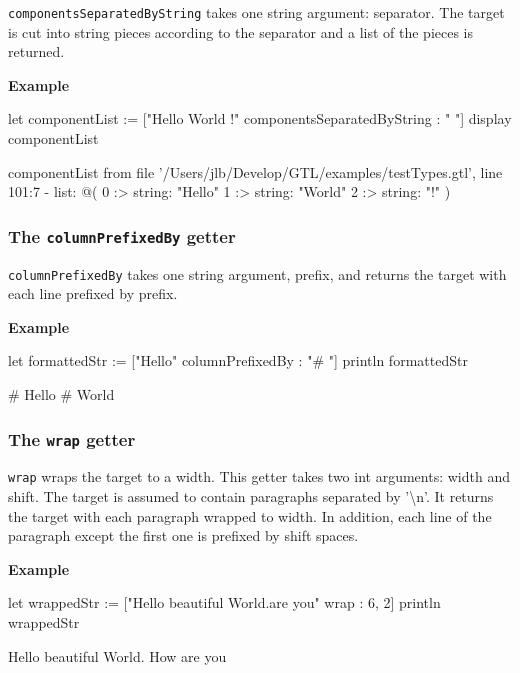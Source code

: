 \documentclass[10pt,openright,twosides]{report}
\newcommand{\ccst}[1]{{\footnotesize\ttfamily\colorbox{light-blue}{'#1'}}}
\newcommand{\gtlarg}[1]{{\footnotesize\ttfamily\colorbox{light-blue}{#1}}}
\newcommand{\gtlinline}[1]{\colorbox{light-blue}{\lstinline[language=gtl]{#1}}}
\newcommand{\example}{\vspace{.75em}\noindent\textbf{Example}\vspace{0em}}
\begin{document}
\gtlinline{componentsSeparatedByString} takes one string argument: \gtlarg{separator}. The target is cut into string pieces according to the \gtlarg{separator} and a list of the pieces is returned.\

\example
\begin{gtl}
let componentList := ["Hello World !" componentsSeparatedByString : " "]
display componentList
\end{gtl}
\begin{console}
componentList from file '/Users/jlb/Develop/GTL/examples/testTypes.gtl', line 101:7
  - list: @(
    0 :>
        string: "Hello"
    1 :>
        string: "World"
    2 :>
        string: "!"
)
\end{console}

\subsubsection{The \texttt{columnPrefixedBy} getter}

\gtlinline{columnPrefixedBy} takes one string argument, \gtlarg{prefix}, and returns the target with each line prefixed by \gtlarg{prefix}.

\example
\begin{gtl}
let formattedStr := ["Hello\nWorld" columnPrefixedBy : "# "]
println formattedStr
\end{gtl}
\begin{console}
# Hello
# World
\end{console}

\subsubsection{The \texttt{wrap} getter}

\gtlinline{wrap} wraps the target to a width. This getter takes two int arguments: \gtlarg{width} and \gtlarg{shift}. The target is assumed to contain paragraphs separated by \ccst{\textbackslash n}. It returns the target with each paragraph wrapped to \gtlarg{width}. In addition, each line of the paragraph except the first one is prefixed by \gtlarg{shift} spaces.

\example
\begin{gtl}
let wrappedStr := ["Hello beautiful World.\nHow are you" wrap : 6, 2]
println wrappedStr
\end{gtl}
\begin{console}
Hello 
  beautiful 
  World. 
How 
  are 
  you 
\end{console}
\end{document}
